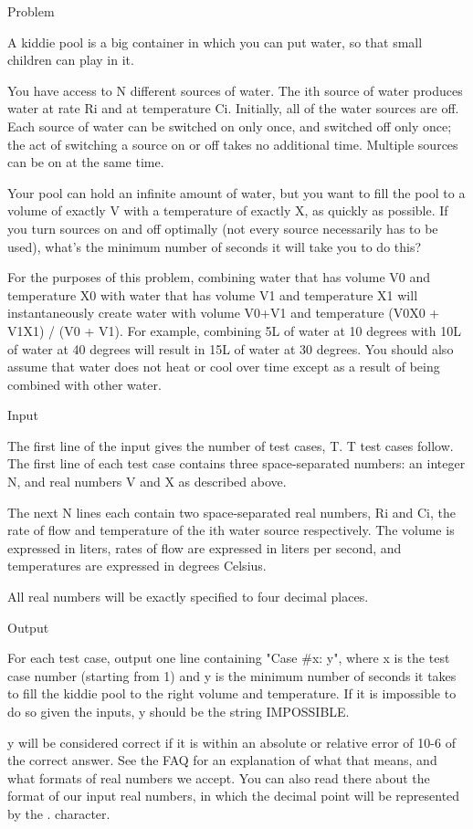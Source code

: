 Problem

A kiddie pool is a big container in which you can put water, so that small children can play in it.

You have access to N different sources of water. The ith source of water produces water at rate Ri and at temperature Ci. Initially, all of the water sources are off. Each source of water can be switched on only once, and switched off only once; the act of switching a source on or off takes no additional time. Multiple sources can be on at the same time.

Your pool can hold an infinite amount of water, but you want to fill the pool to a volume of exactly V with a temperature of exactly X, as quickly as possible. If you turn sources on and off optimally (not every source necessarily has to be used), what's the minimum number of seconds it will take you to do this?

For the purposes of this problem, combining water that has volume V0 and temperature X0 with water that has volume V1 and temperature X1 will instantaneously create water with volume V0+V1 and temperature (V0X0 + V1X1) / (V0 + V1). For example, combining 5L of water at 10 degrees with 10L of water at 40 degrees will result in 15L of water at 30 degrees. You should also assume that water does not heat or cool over time except as a result of being combined with other water.

Input

The first line of the input gives the number of test cases, T. T test cases follow. The first line of each test case contains three space-separated numbers: an integer N, and real numbers V and X as described above.

The next N lines each contain two space-separated real numbers, Ri and Ci, the rate of flow and temperature of the ith water source respectively. The volume is expressed in liters, rates of flow are expressed in liters per second, and temperatures are expressed in degrees Celsius.

All real numbers will be exactly specified to four decimal places.

Output

For each test case, output one line containing "Case #x: y", where x is the test case number (starting from 1) and y is the minimum number of seconds it takes to fill the kiddie pool to the right volume and temperature. If it is impossible to do so given the inputs, y should be the string IMPOSSIBLE.

y will be considered correct if it is within an absolute or relative error of 10-6 of the correct answer. See the FAQ for an explanation of what that means, and what formats of real numbers we accept. You can also read there about the format of our input real numbers, in which the decimal point will be represented by the . character.


